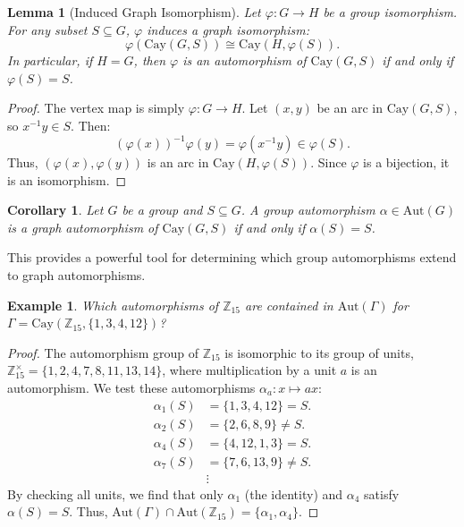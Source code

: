 \documentclass[12pt,a4paper,openany]{book}
\newtheorem{example}{Example}[section]
\newtheorem{lemma}{Lemma}[section]
\newtheorem{corollary}{Corollary}[section]
\begin{document}
\begin{lemma}[Induced Graph Isomorphism]\label{lem:cayley-iso}
Let $\varphi: G \to H$ be a group isomorphism. For any subset $S \subseteq G$, $\varphi$ induces a graph isomorphism:
\[
\varphi(\mathrm{Cay}(G, S)) \cong \mathrm{Cay}(H, \varphi(S)).
\]
In particular, if $H = G$, then $\varphi$ is an automorphism of $\mathrm{Cay}(G, S)$ if and only if $\varphi(S) = S$.
\end{lemma}
\begin{proof}
The vertex map is simply $\varphi: G \to H$. Let $(x, y)$ be an arc in $\mathrm{Cay}(G, S)$, so $x^{-1}y \in S$. Then:
\[
(\varphi(x))^{-1} \varphi(y) = \varphi(x^{-1}y) \in \varphi(S).
\]
Thus, $(\varphi(x), \varphi(y))$ is an arc in $\mathrm{Cay}(H, \varphi(S))$. Since $\varphi$ is a bijection, it is an isomorphism.
\end{proof}

\begin{corollary}\label{cor:aut-group-iso}
Let $G$ be a group and $S \subseteq G$. A group automorphism $\alpha \in \mathrm{Aut}(G)$ is a graph automorphism of $\mathrm{Cay}(G, S)$ if and only if $\alpha(S) = S$.
\end{corollary}

This provides a powerful tool for determining which group automorphisms extend to graph automorphisms.

\begin{example}
Which automorphisms of $\mathbb{Z}_{15}$ are contained in $\mathrm{Aut}(\Gamma)$ for $\Gamma = \mathrm{Cay}(\mathbb{Z}_{15}, \{1, 3, 4, 12\})$?
\end{example}
\begin{proof}
The automorphism group of $\mathbb{Z}_{15}$ is isomorphic to its group of units, $\mathbb{Z}_{15}^\times = \{1, 2, 4, 7, 8, 11, 13, 14\}$, where multiplication by a unit $a$ is an automorphism. We test these automorphisms $\alpha_a: x \mapsto ax$:
\begin{align*}
\alpha_1(S) &= \{1, 3, 4, 12\} = S. \\
\alpha_2(S) &= \{2, 6, 8, 9\} \ne S. \\
\alpha_4(S) &= \{4, 12, 1, 3\} = S. \\
\alpha_7(S) &= \{7, 6, 13, 9\} \ne S. \\
&\vdots
\end{align*}
By checking all units, we find that only $\alpha_1$ (the identity) and $\alpha_4$ satisfy $\alpha(S)=S$. Thus, $\mathrm{Aut}(\Gamma) \cap \mathrm{Aut}(\mathbb{Z}_{15}) = \{\alpha_1, \alpha_4\}$.
\end{proof}
\end{document}
